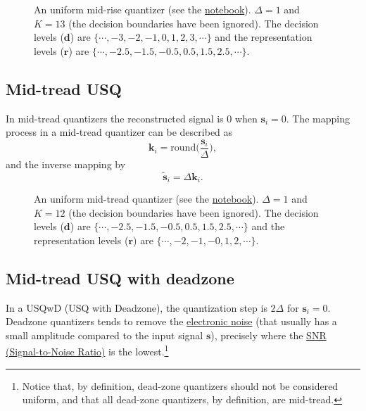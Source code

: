 \begin{figure}
  \caption{An uniform mid-rise quantizer (see the
    \href{https://nbviewer.jupyter.org/github/vicente-gonzalez-ruiz/scalar_quantization/blob/master/graphics/midrise.ipynb}{notebook}). $\Delta=1$
    and $K=13$ (the decision boundaries have been ignored). The
    decision levels (${\mathbf d}$) are $\{\cdots,-3,-2,-1,0,1,2,3,\cdots\}$
    and the representation levels (${\mathbf r}$) are
    $\{\cdots,-2.5,-1.5,-0.5,0.5,1.5,2.5,\cdots\}$.}
  \label{fig:midrise}
\end{figure}

\subsection{Mid-tread USQ}

In mid-tread quantizers the reconstructed signal is $0$ when ${\mathbf
  s}_i=0$. The mapping process in a mid-tread quantizer can be described as
\begin{equation}
  {\mathbf k}_i = \mathrm{round}\Big( \frac{{\mathbf s}_i}{\Delta} \Big),
  \label{eq:midrise}
\end{equation}
and the inverse mapping by
\begin{equation}
  \tilde{\mathbf s}_i = \Delta{\mathbf k}_i.
  \label{eq:inverse_midrise}
\end{equation}

\begin{figure}
  \caption{An uniform mid-tread quantizer (see the
    \href{https://nbviewer.jupyter.org/github/vicente-gonzalez-ruiz/scalar_quantization/blob/master/graphics/midtread.ipynb}{notebook}). $\Delta=1$
    and $K=12$ (the decision boundaries have been ignored). The
    decision levels (${\mathbf d}$) are $\{\cdots,-2.5,-1.5,-0.5,0.5,1.5,2.5,\cdots\}$
    and the representation levels (${\mathbf r}$) are
    $\{\cdots,-2,-1,-0,1,2,\cdots\}$.}
  \label{fig:midtread}
\end{figure}

\subsection{Mid-tread USQ with deadzone}

In a USQwD (USQ with Deadzone), the quantization step is $2\Delta$ for
${\mathbf s}_i=0$. Deadzone quantizers tends to remove the
\href{https://en.wikipedia.org/wiki/Noise_(electronics)}{electronic
  noise} (that usually has a small amplitude compared to the input
signal ${\mathbf s}$), precisely where the
\href{https://en.wikipedia.org/wiki/Signal-to-noise_ratio}{SNR
  (Signal-to-Noise Ratio)} is the lowest.\footnote{Notice that, by
  definition, dead-zone quantizers should not be considered uniform,
  and that all dead-zone quantizers, by definition, are mid-tread.}

